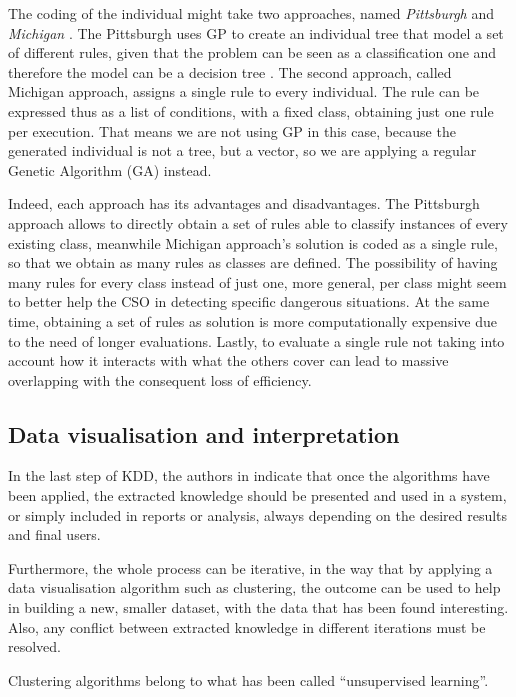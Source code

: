 The coding of the individual might take two approaches, named \textit{Pittsburgh} and \textit{Michigan} \cite{freitas2002data}. The Pittsburgh uses GP to create an individual tree that model a set of different rules, given that the problem can be seen as
a classification one and therefore the model can be a decision tree \cite{safavian1990survey}. The second approach, called Michigan approach, assigns a single rule to every individual. The rule can be expressed thus as a list of conditions, with a fixed class, obtaining just one rule per execution. That means we are not using GP in this case, because the generated individual is not a tree, but a vector, so we are applying a regular Genetic Algorithm (GA) instead.

Indeed, each approach has its advantages and disadvantages. The Pittsburgh approach allows to directly obtain a set of rules able to classify instances of every existing class, meanwhile Michigan approach's solution is coded as a single rule, so that we obtain as many rules as classes are defined. The possibility of having many rules for every class instead of just one, more general, per class might seem to better help the CSO in detecting specific dangerous situations.
At the same time, obtaining a set of rules as solution is more computationally expensive due to the need of longer evaluations. Lastly, to evaluate a single rule not taking into account how it interacts with what the others cover \cite{freitas2002data} can lead to massive overlapping with the consequent loss of efficiency. 

\subsection{Data visualisation and interpretation}

In the last step of KDD, the authors in \cite{fayyad1996data} indicate that once the algorithms have been applied, the extracted knowledge should be presented and used in a system, or simply included in reports or analysis, always depending on the desired results and final users.

Furthermore, the whole process can be iterative, in the way that by applying a data visualisation algorithm such as clustering, the outcome can be used to help in building a new, smaller dataset, with the data that has been found interesting. Also, any conflict between extracted knowledge in different iterations must be resolved.

Clustering algorithms belong to what has been called ``unsupervised learning''.